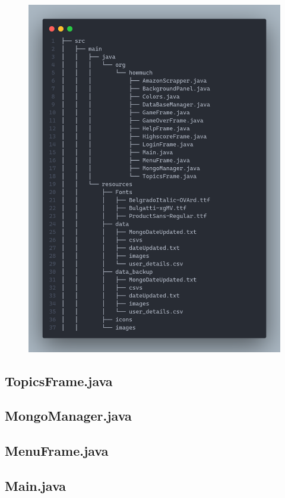 \documentclass[11pt]{article}
\begin{document}
\begin{figure}[H]
	\centering
	\includegraphics[scale=0.3]{code2.png}
	\caption{}
\end{figure}
\subsection{TopicsFrame.java}

\subsection{MongoManager.java}

\subsection{MenuFrame.java}

\subsection{Main.java}
\end{document}
